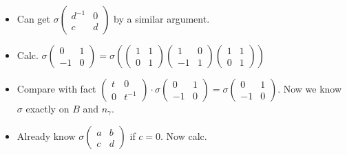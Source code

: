 \begin{itemize}
\item Can get  $\sigma\left(\begin{matrix}d^{-1}&0\\c&d\end{matrix}\right)$ by a similar argument.
\item Calc.  $\sigma\left(\begin{matrix}0&1\\-1&0\end{matrix}\right) =
\sigma\left(
\left(\begin{matrix}1&1\\0&1\end{matrix}\right)
\left(\begin{matrix}1&0\\-1&1\end{matrix}\right)
\left(\begin{matrix}1&1\\0&1\end{matrix}\right)
\right)$
\item Compare with fact $
\left(\begin{matrix}t&0\\0&t^{-1}\end{matrix}\right)\cdot
\sigma\left(\begin{matrix}0&1\\-1&0\end{matrix}\right)=
\sigma\left(\begin{matrix}0&1\\-1&0\end{matrix}\right)$. Now we know $\sigma$ exactly on $B$ and $n_\gamma$.
\item Already know 
$\sigma\left(\begin{matrix}a&b\\c&d\end{matrix}\right)$ if $c=0$. Now calc.


\end{itemize}
